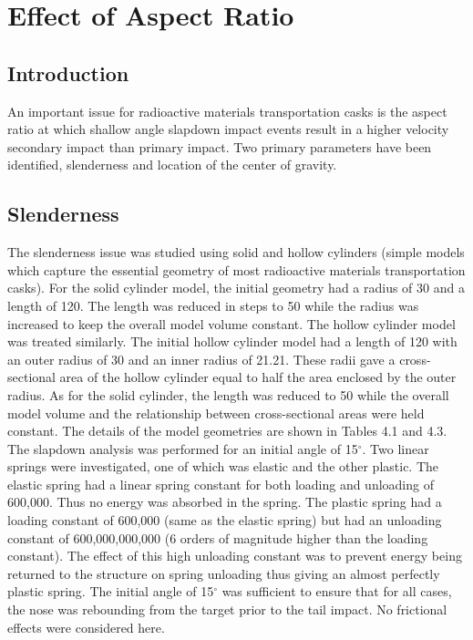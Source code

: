 \chapter{Effect of Aspect Ratio}

\section{Introduction}

     An important issue for radioactive materials transportation casks
is the aspect ratio at which shallow angle slapdown impact events
result in a higher velocity secondary impact than primary impact.  Two
primary parameters have been identified, slenderness and location of
the center of gravity.

\section{Slenderness}

The slenderness issue was studied using solid and hollow cylinders
(simple models which capture the essential geometry of most
radioactive materials transportation casks).  For the solid cylinder
model, the initial geometry had a radius of 30 and a length of 120.
The length was reduced in steps to 50 while the radius was increased
to keep the overall model volume constant. The
hollow cylinder model was treated similarly.  The initial
hollow cylinder model
had a length of 120 with an outer radius of 30 and an inner
radius of 21.21.  These radii gave a cross-sectional area of the
hollow cylinder equal to half the area enclosed by the outer radius.
As for the solid cylinder, the length was reduced to 50 while the
overall model volume and the relationship between cross-sectional
areas were held constant. The details of the model geometries are
shown in Tables 4.1 and 4.3.
The slapdown analysis was performed for an
initial angle of 15$^\circ$.  Two linear springs were investigated, one of
which was elastic and the other plastic.  The elastic spring had a
linear spring constant for both loading and unloading of 600,000.
Thus no energy was absorbed in the spring.  The plastic spring had a
loading constant of 600,000 (same as the elastic spring) but had an
unloading constant of 600,000,000,000 (6 orders of magnitude higher
than the loading constant).  The effect of this high unloading
constant was to prevent energy being returned to the structure on
spring unloading thus giving an almost perfectly plastic spring. The
initial angle of 15$^\circ$ was sufficient to ensure that for all cases,
the nose was rebounding from the target prior to the tail impact.  No
frictional effects were considered here.

